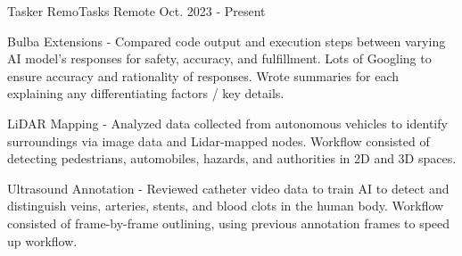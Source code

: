 

\begin{cventries}

  \cventry
    {Tasker} %
    {RemoTasks} %
    {Remote} %
    {Oct. 2023 - Present} %
    {
      \begin{cvitems} %
		  \item {Bulba Extensions - Compared code output and execution steps between varying AI model's responses for safety, accuracy, and fulfillment. Lots of Googling to ensure accuracy and rationality of responses. Wrote summaries for each explaining any differentiating factors / key details.}
		  \item {LiDAR Mapping - Analyzed data collected from autonomous vehicles to identify surroundings via image data and Lidar-mapped nodes. Workflow consisted of detecting pedestrians, automobiles, hazards, and authorities in 2D and 3D spaces.}
		  \item {Ultrasound Annotation - Reviewed catheter video data to train AI to detect and distinguish veins, arteries, stents, and blood clots in the human body. Workflow consisted of frame-by-frame outlining, using previous annotation frames to speed up workflow.}
      \end{cvitems}
    }

\end{cventries}
